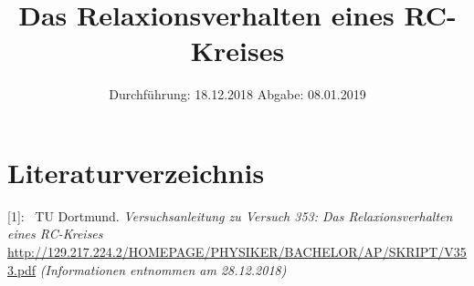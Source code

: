 

\subject{Nr. 353}
\title{Das Relaxionsverhalten eines RC-Kreises}
\date{%
  Durchführung: 18.12.2018
  \hspace{3em}
  Abgabe: 08.01.2019
}



\maketitle
\thispagestyle{empty}
\tableofcontents
\newpage






\printbibliography{}

\section{Literaturverzeichnis}

[1]: \ TU Dortmund. \textit{Versuchsanleitung zu Versuch 353: Das Relaxionsverhalten eines RC-Kreises}\newline
\url{http://129.217.224.2/HOMEPAGE/PHYSIKER/BACHELOR/AP/SKRIPT/V353.pdf}
\textit{(Informationen entnommen am 28.12.2018)}\newline



